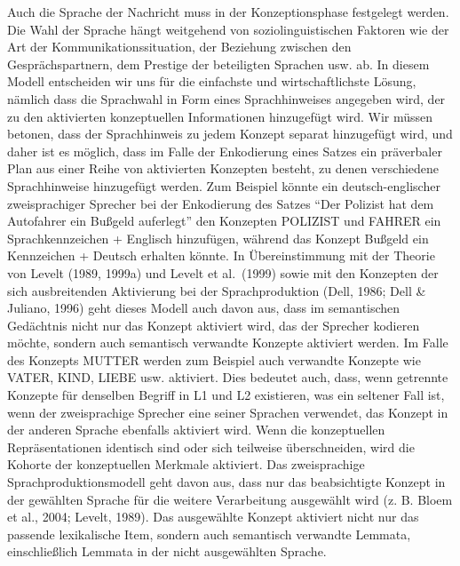 \documentclass[
  letterpaper,
]{scrbook}
\begin{document}
Auch die Sprache der Nachricht muss in der Konzeptionsphase festgelegt
werden. Die Wahl der Sprache hängt weitgehend von soziolinguistischen
Faktoren wie der Art der Kommunikationssituation, der Beziehung zwischen
den Gesprächspartnern, dem Prestige der beteiligten Sprachen usw. ab. In
diesem Modell entscheiden wir uns für die einfachste und
wirtschaftlichste Lösung, nämlich dass die Sprachwahl in Form eines
Sprachhinweises angegeben wird, der zu den aktivierten konzeptuellen
Informationen hinzugefügt wird. Wir müssen betonen, dass der
Sprachhinweis zu jedem Konzept separat hinzugefügt wird, und daher ist
es möglich, dass im Falle der Enkodierung eines Satzes ein präverbaler
Plan aus einer Reihe von aktivierten Konzepten besteht, zu denen
verschiedene Sprachhinweise hinzugefügt werden. Zum Beispiel könnte ein
deutsch-englischer zweisprachiger Sprecher bei der Enkodierung des
Satzes ``Der Polizist hat dem Autofahrer ein Bußgeld auferlegt'' den
Konzepten POLIZIST und FAHRER ein Sprachkennzeichen + Englisch
hinzufügen, während das Konzept Bußgeld ein Kennzeichen + Deutsch
erhalten könnte. In Übereinstimmung mit der Theorie von Levelt (1989,
1999a) und Levelt et al.~(1999) sowie mit den Konzepten der sich
ausbreitenden Aktivierung bei der Sprachproduktion (Dell, 1986; Dell \&
Juliano, 1996) geht dieses Modell auch davon aus, dass im semantischen
Gedächtnis nicht nur das Konzept aktiviert wird, das der Sprecher
kodieren möchte, sondern auch semantisch verwandte Konzepte aktiviert
werden. Im Falle des Konzepts MUTTER werden zum Beispiel auch verwandte
Konzepte wie VATER, KIND, LIEBE usw. aktiviert. Dies bedeutet auch,
dass, wenn getrennte Konzepte für denselben Begriff in L1 und L2
existieren, was ein seltener Fall ist, wenn der zweisprachige Sprecher
eine seiner Sprachen verwendet, das Konzept in der anderen Sprache
ebenfalls aktiviert wird. Wenn die konzeptuellen Repräsentationen
identisch sind oder sich teilweise überschneiden, wird die Kohorte der
konzeptuellen Merkmale aktiviert. Das zweisprachige
Sprachproduktionsmodell geht davon aus, dass nur das beabsichtigte
Konzept in der gewählten Sprache für die weitere Verarbeitung ausgewählt
wird (z. B. Bloem et al., 2004; Levelt, 1989). Das ausgewählte Konzept
aktiviert nicht nur das passende lexikalische Item, sondern auch
semantisch verwandte Lemmata, einschließlich Lemmata in der nicht
ausgewählten Sprache.
\end{document}
